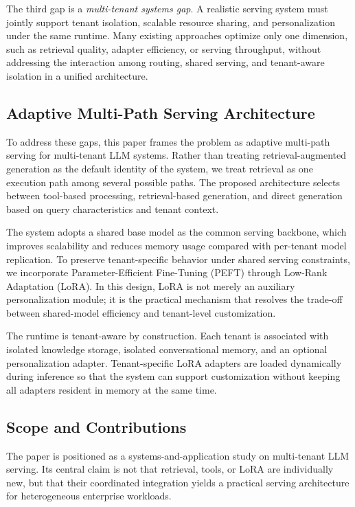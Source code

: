 The third gap is a \textit{multi-tenant systems gap}. A realistic serving system must jointly support tenant isolation, scalable resource sharing, and personalization under the same runtime. Many existing approaches optimize only one dimension, such as retrieval quality, adapter efficiency, or serving throughput, without addressing the interaction among routing, shared serving, and tenant-aware isolation in a unified architecture.

\subsection{Adaptive Multi-Path Serving Architecture}

To address these gaps, this paper frames the problem as adaptive multi-path serving for multi-tenant LLM systems. Rather than treating retrieval-augmented generation as the default identity of the system, we treat retrieval as one execution path among several possible paths. The proposed architecture selects between tool-based processing, retrieval-based generation, and direct generation based on query characteristics and tenant context.

The system adopts a shared base model as the common serving backbone, which improves scalability and reduces memory usage compared with per-tenant model replication. To preserve tenant-specific behavior under shared serving constraints, we incorporate Parameter-Efficient Fine-Tuning (PEFT) through Low-Rank Adaptation (LoRA). In this design, LoRA is not merely an auxiliary personalization module; it is the practical mechanism that resolves the trade-off between shared-model efficiency and tenant-level customization.

The runtime is tenant-aware by construction. Each tenant is associated with isolated knowledge storage, isolated conversational memory, and an optional personalization adapter. Tenant-specific LoRA adapters are loaded dynamically during inference so that the system can support customization without keeping all adapters resident in memory at the same time.

\subsection{Scope and Contributions}

The paper is positioned as a systems-and-application study on multi-tenant LLM serving. Its central claim is not that retrieval, tools, or LoRA are individually new, but that their coordinated integration yields a practical serving architecture for heterogeneous enterprise workloads.

